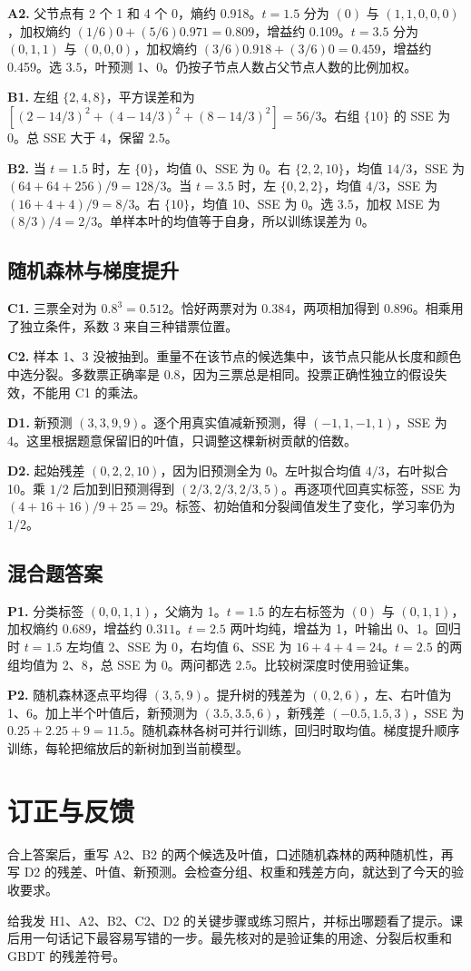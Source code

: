\documentclass[UTF8,a4paper,11pt]{ctexart}
\begin{document}
\textbf{A2.} 父节点有 2 个 1 和 4 个 0，熵约 0.918。$t=1.5$ 分为 $(0)$ 与 $(1,1,0,0,0)$，加权熵约 $(1/6)0+(5/6)0.971=0.809$，增益约 0.109。$t=3.5$ 分为 $(0,1,1)$ 与 $(0,0,0)$，加权熵约 $(3/6)0.918+(3/6)0=0.459$，增益约 0.459。选 $3.5$，叶预测 1、0。仍按子节点人数占父节点人数的比例加权。

\textbf{B1.} 左组 $\{2,4,8\}$，平方误差和为 $[(2-14/3)^2+(4-14/3)^2+(8-14/3)^2]=56/3$。右组 $\{10\}$ 的 SSE 为 0。总 SSE 大于 4，保留 $2.5$。

\textbf{B2.} 当 $t=1.5$ 时，左 $\{0\}$，均值 0、SSE 为 0。右 $\{2,2,10\}$，均值 $14/3$，SSE 为 $(64+64+256)/9=128/3$。当 $t=3.5$ 时，左 $\{0,2,2\}$，均值 $4/3$，SSE 为 $(16+4+4)/9=8/3$。右 $\{10\}$，均值 10、SSE 为 0。选 $3.5$，加权 MSE 为 $(8/3)/4=2/3$。单样本叶的均值等于自身，所以训练误差为 0。

\subsection{随机森林与梯度提升}
\textbf{C1.} 三票全对为 $0.8^3=0.512$。恰好两票对为 $0.384$，两项相加得到 $0.896$。相乘用了独立条件，系数 3 来自三种错票位置。

\textbf{C2.} 样本 1、3 没被抽到。重量不在该节点的候选集中，该节点只能从长度和颜色中选分裂。多数票正确率是 0.8，因为三票总是相同。投票正确性独立的假设失效，不能用 C1 的乘法。

\textbf{D1.} 新预测 $(3,3,9,9)$。逐个用真实值减新预测，得 $(-1,1,-1,1)$，SSE 为 4。这里根据题意保留旧的叶值，只调整这棵新树贡献的倍数。

\textbf{D2.} 起始残差 $(0,2,2,10)$，因为旧预测全为 0。左叶拟合均值 $4/3$，右叶拟合 10。乘 $1/2$ 后加到旧预测得到 $(2/3,2/3,2/3,5)$。再逐项代回真实标签，SSE 为 $(4+16+16)/9+25=29$。标签、初始值和分裂阈值发生了变化，学习率仍为 $1/2$。

\clearpage
\subsection{混合题答案}
\textbf{P1.} 分类标签 $(0,0,1,1)$，父熵为 1。$t=1.5$ 的左右标签为 $(0)$ 与 $(0,1,1)$，加权熵约 $0.689$，增益约 $0.311$。$t=2.5$ 两叶均纯，增益为 1，叶输出 0、1。回归时 $t=1.5$ 左均值 2、SSE 为 0，右均值 6、SSE 为 $16+4+4=24$。$t=2.5$ 的两组均值为 2、8，总 SSE 为 0。两问都选 $2.5$。比较树深度时使用验证集。

\textbf{P2.} 随机森林逐点平均得 $(3,5,9)$。提升树的残差为 $(0,2,6)$，左、右叶值为 1、6。加上半个叶值后，新预测为 $(3.5,3.5,6)$，新残差 $(-0.5,1.5,3)$，SSE 为 $0.25+2.25+9=11.5$。随机森林各树可并行训练，回归时取均值。梯度提升顺序训练，每轮把缩放后的新树加到当前模型。

\section{订正与反馈}
合上答案后，重写 A2、B2 的两个候选及叶值，口述随机森林的两种随机性，再写 D2 的残差、叶值、新预测。会检查分组、权重和残差方向，就达到了今天的验收要求。

给我发 H1、A2、B2、C2、D2 的关键步骤或练习照片，并标出哪题看了提示。课后用一句话记下最容易写错的一步。最先核对的是验证集的用途、分裂后权重和 GBDT 的残差符号。
\end{document}
